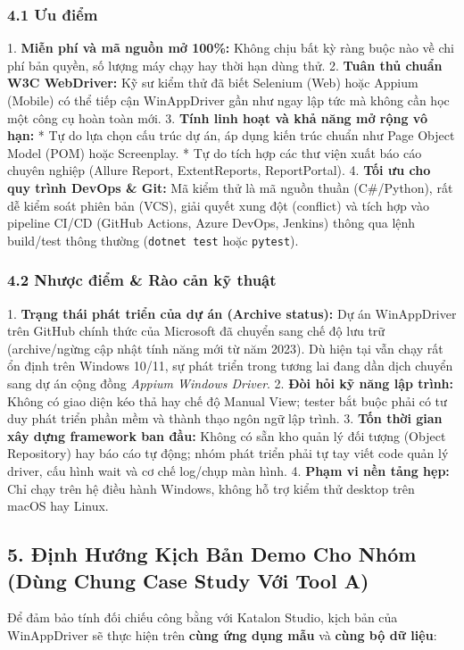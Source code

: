 \subsubsection{4.1 Ưu điểm}
1. \textbf{Miễn phí và mã nguồn mở 100\%:} Không chịu bất kỳ ràng buộc nào về chi phí bản quyền, số lượng máy chạy hay thời hạn dùng thử.
2. \textbf{Tuân thủ chuẩn W3C WebDriver:} Kỹ sư kiểm thử đã biết Selenium (Web) hoặc Appium (Mobile) có thể tiếp cận WinAppDriver gần như ngay lập tức mà không cần học một công cụ hoàn toàn mới.
3. \textbf{Tính linh hoạt và khả năng mở rộng vô hạn:}
   * Tự do lựa chọn cấu trúc dự án, áp dụng kiến trúc chuẩn như Page Object Model (POM) hoặc Screenplay.
   * Tự do tích hợp các thư viện xuất báo cáo chuyên nghiệp (Allure Report, ExtentReports, ReportPortal).
4. \textbf{Tối ưu cho quy trình DevOps & Git:} Mã kiểm thử là mã nguồn thuần (C#/Python), rất dễ kiểm soát phiên bản (VCS), giải quyết xung đột (conflict) và tích hợp vào pipeline CI/CD (GitHub Actions, Azure DevOps, Jenkins) thông qua lệnh build/test thông thường (\texttt{dotnet test} hoặc \texttt{pytest}).

\subsubsection{4.2 Nhược điểm \& Rào cản kỹ thuật}
1. \textbf{Trạng thái phát triển của dự án (Archive status):} Dự án WinAppDriver trên GitHub chính thức của Microsoft đã chuyển sang chế độ lưu trữ (archive/ngừng cập nhật tính năng mới từ năm 2023). Dù hiện tại vẫn chạy rất ổn định trên Windows 10/11, sự phát triển trong tương lai đang dần dịch chuyển sang dự án cộng đồng \textit{Appium Windows Driver}.
2. \textbf{Đòi hỏi kỹ năng lập trình:} Không có giao diện kéo thả hay chế độ Manual View; tester bắt buộc phải có tư duy phát triển phần mềm và thành thạo ngôn ngữ lập trình.
3. \textbf{Tốn thời gian xây dựng framework ban đầu:} Không có sẵn kho quản lý đối tượng (Object Repository) hay báo cáo tự động; nhóm phát triển phải tự tay viết code quản lý driver, cấu hình wait và cơ chế log/chụp màn hình.
4. \textbf{Phạm vi nền tảng hẹp:} Chỉ chạy trên hệ điều hành Windows, không hỗ trợ kiểm thử desktop trên macOS hay Linux.


\subsection{5. Định Hướng Kịch Bản Demo Cho Nhóm (Dùng Chung Case Study Với Tool A)}

Để đảm bảo tính đối chiếu công bằng với Katalon Studio, kịch bản của WinAppDriver sẽ thực hiện trên \textbf{cùng ứng dụng mẫu} và \textbf{cùng bộ dữ liệu}:

